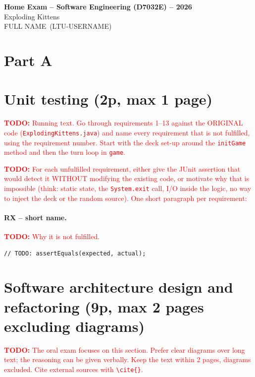 \documentclass[12pt,a4paper]{article}
\newcommand{\fullname}{FULL NAME}
\newcommand{\username}{LTU-USERNAME}
\newcommand{\todo}[1]{\textcolor{red}{\textbf{TODO:} #1}}   %
\newcommand{\req}[1]{\textbf{R#1}}                          %
\newcommand{\code}[1]{\texttt{#1}}
\begin{document}
\begin{center}
  {\Large\bfseries Home Exam -- Software Engineering (D7032E) -- 2026}\\[0.4em]
  {\large Exploding Kittens}\\[0.4em]
  \fullname\ (\username)
\end{center}

\section*{Part A}

\section{Unit testing (2p, max 1 page)}
\label{sec:q1}

\todo{Running text. Go through requirements 1--13 against the ORIGINAL code
(\code{ExplodingKittens.java}) and name every requirement that is not fulfilled,
using the requirement number. Start with the deck set-up around the \code{initGame}
method and then the turn loop in \code{game}.}

\todo{For each unfulfilled requirement, either give the JUnit assertion that would
detect it WITHOUT modifying the existing code, or motivate why that is impossible
(think: static state, the \code{System.exit} call, I/O inside the logic, no way to
inject the deck or the random source). One short paragraph per requirement:}

\paragraph{\req{X} -- short name.}
\todo{Why it is not fulfilled.}
\begin{lstlisting}[caption={Possible JUnit check for \req{X}.}]
// TODO: assertEquals(expected, actual);
\end{lstlisting}

\section{Software architecture design and refactoring (9p, max 2 pages excluding diagrams)}
\label{sec:q2}

\todo{The oral exam focuses on this section. Prefer clear diagrams over long text;
the reasoning can be given verbally. Keep the text within 2 pages, diagrams excluded.
Cite external sources with \code{\textbackslash cite\{\}}.}
\end{document}
